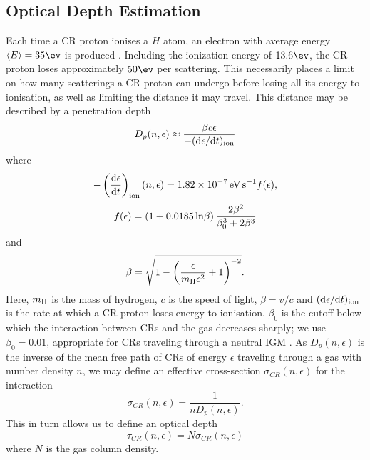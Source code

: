 \subsection{Optical Depth Estimation}
Each time a CR proton ionises a $H$ atom, an electron with average energy $\langle E \rangle = 35\ev$ is produced \citep{SpitzerTomasko1968}.  Including the ionization energy of $13.6\ev$, the CR proton loses approximately $50\ev$ per scattering. This necessarily places a limit on how many scatterings a CR proton can undergo before losing all its energy to ionisation, as well as limiting the distance it may travel.  This distance may be described by a penetration depth 
\begin{equation}
    D_p(n, \epsilon) \approx \frac{\beta c \epsilon} {-({\rm d}\epsilon / {\rm d}t)_{\rm ion}}
\end{equation}
where \citep{Schlickeiser2002}
\begin{equation}
    - \left( \frac{{\rm d}\epsilon} {{\rm d}t} \right)_{\rm ion}(n, \epsilon)
    = 1.82\times10^{-7}\,{\rm \small eV\,s}^{-1} f(\epsilon),
\end{equation}
\begin{equation}    
    f(\epsilon) = (1 + 0.0185 \,{\rm ln}\beta )\, \frac{2 \beta^2}{\beta_0^3 + 2 \beta^3}
\end{equation}
and 
\begin{equation}
    \beta =  \sqrt{1 - \left( \frac{\epsilon}{m_{\rm \tiny H}c^2}+1 \right)^{-2}}.
\end{equation}
Here, $m_{\rm \small H}$ is the mass of hydrogen, $c$ is the speed of light, $\beta = v/c$ and $({\rm d}\epsilon / {\rm d}t)_{\rm ion}$ is the rate at which a CR proton loses energy to ionisation. $\beta_0$ is the cutoff below which the interaction between CRs and the gas decreases sharply; we use $\beta_0=0.01$, appropriate for CRs traveling through a neutral IGM \citep{StacyBromm2007}.
As $D_p(n, \epsilon)$ is the inverse of the mean free path of CRs of energy $\epsilon$ traveling through a gas with number density $n$, we may define an effective cross-section $\sigma_{CR}(n,\epsilon)$ for the interaction
\begin{equation}
\sigma_{CR}(n,\epsilon) = \frac{1}{n D_p(n, \epsilon)}.
\end{equation}
This in turn allows us to define an optical depth
\begin{equation}
\tau_{CR}(n,\epsilon) = N \sigma_{CR}(n,\epsilon)
\end{equation}
where $N$ is the gas column density.

